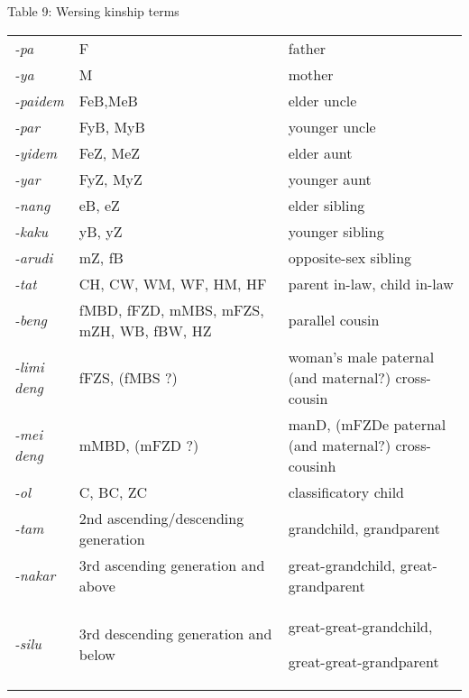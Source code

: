 {\centering
 Table 9: Wersing kinship terms
\par}

\begin{center}
\tablehead{}
\begin{supertabular}{m{0.8073598in}m{2.6434598in}m{2.72956in}}
\textit{{}-pa} &
F &
father\\
\textit{{}-ya} &
M &
mother\\
\textit{{}-paidem} &
FeB,MeB &
elder uncle\\
\textit{{}-par} &
FyB, MyB &
younger uncle\\
\textit{{}-yidem} &
FeZ, MeZ &
elder aunt\\
\textit{{}-yar} &
FyZ, MyZ &
younger aunt\\
\textit{{}-nang} &
eB, eZ &
elder sibling\\
\textit{{}-kaku} &
yB, yZ &
younger sibling\\
\textit{{}-arudi} &
mZ, fB &
opposite-sex sibling\\
\textit{{}-tat} &
CH, CW, WM, WF, HM, HF &
parent in-law, child in-law\\
\textit{{}-beng} &
fMBD, fFZD, mMBS, mFZS, mZH, WB, fBW, HZ &
parallel cousin\\
\textit{{}-limi deng} &
fFZS, (fMBS ?) &
woman{\textquoteright}s male paternal (and maternal?) cross-cousin\\
\textit{{}-mei deng} &
mMBD, (mFZD ?) &
manD, (mFZDe paternal (and maternal?) cross-cousinh\\
\textit{{}-ol} &
C, BC, ZC &
classificatory child\\
\textit{{}-tam} &
2nd ascending/descending generation &
grandchild, grandparent\\
\textit{{}-nakar} &
3rd ascending generation and above &
great-grandchild, great-grandparent\\
\textit{{}-silu} &
3rd descending generation and below &
great-great-grandchild, 

great-great-grandparent\\
\end{supertabular}
\end{center}
